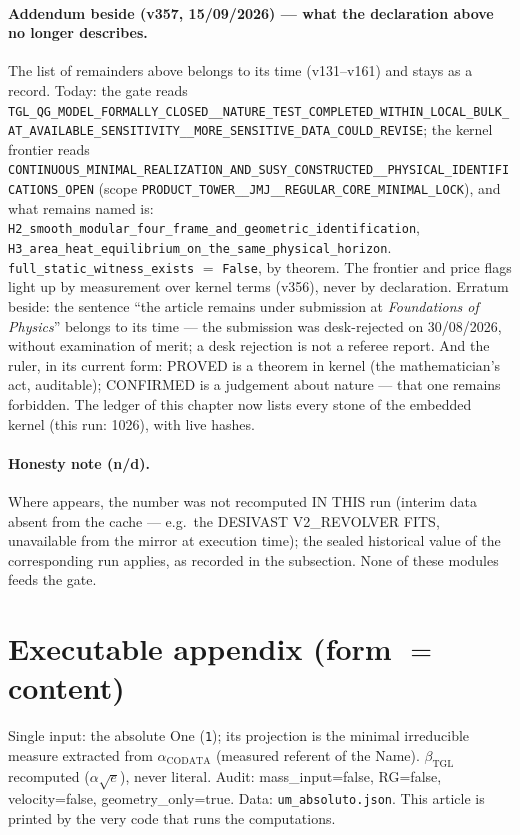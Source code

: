 \documentclass[11pt]{article}
\newcommand{\bTGL}{\beta_{\mathrm{TGL}}}\newcommand{\Msun}{M_{\odot}}\newcommand{\TGL}{\mathrm{TGL}}
\theoremstyle{definition}\newtheorem{deriv}{Derivation}
\begin{document}
\paragraph*{Addendum beside (v357, 15/09/2026) --- what the declaration above no longer describes.} The list of remainders above belongs to its time (v131--v161) and stays as a record. Today: the gate reads \texttt{TGL\_QG\_MODEL\_FORMALLY\_CLOSED\_\_NATURE\_TEST\_COMPLETED\_WITHIN\_LOCAL\_BULK\_AT\_AVAILABLE\_SENSITIVITY\_\_MORE\_SENSITIVE\_DATA\_COULD\_REVISE}; the kernel frontier reads \texttt{CONTINUOUS\_MINIMAL\_REALIZATION\_AND\_SUSY\_CONSTRUCTED\_\_PHYSICAL\_IDENTIFICATIONS\_OPEN} (scope \texttt{PRODUCT\_TOWER\_\_JMJ\_\_REGULAR\_CORE\_MINIMAL\_LOCK}), and what remains named is: \texttt{H2\_smooth\_modular\_four\_frame\_and\_geometric\_identification}, \texttt{H3\_area\_heat\_equilibrium\_on\_the\_same\_physical\_horizon}. \texttt{full\_static\_witness\_exists} $=$ \texttt{False}, by theorem. The frontier and price flags light up by measurement over kernel terms (v356), never by declaration. Erratum beside: the sentence ``the article remains under submission at \emph{Foundations of Physics}'' belongs to its time --- the submission was desk-rejected on 30/08/2026, without examination of merit; a desk rejection is not a referee report. And the ruler, in its current form: PROVED is a theorem in kernel (the mathematician's act, auditable); CONFIRMED is a judgement about nature --- that one remains forbidden. The ledger of this chapter now lists every stone of the embedded kernel (this run: 1026), with live hashes.

\paragraph{Honesty note (n/d).} Where  appears, the number was not recomputed IN THIS run (interim data absent from the cache --- e.g.\ the DESIVAST V2\_REVOLVER FITS, unavailable from the mirror at execution time); the sealed historical value of the corresponding run applies, as recorded in the subsection. None of these modules feeds the gate.

\section*{Executable appendix (form $=$ content)}

Single input: the absolute One (\texttt{1}); its projection is the minimal irreducible measure extracted from $\alpha_{\mathrm{CODATA}}$ (measured referent of the Name). $\bTGL$ recomputed ($\alpha\sqrt{e}$), never literal. Audit: mass\_input=false, RG=false, velocity=false, geometry\_only=true. Data: \texttt{um\_absoluto.json}. This article is printed by the very code that runs the computations.
\end{document}
